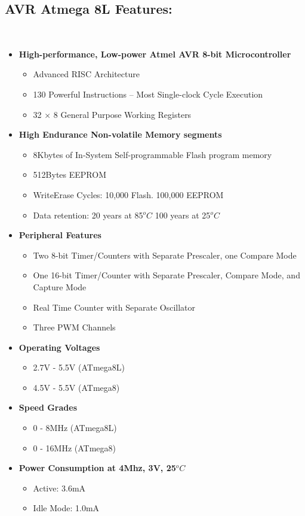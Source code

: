\documentclass[12pt, a4paper]{article}
\begin{document}
{\begin{appendices}
\section{AVR Atmega 8L Features:}
~\\
\begin{itemize}
\item \textbf{High-performance, Low-power Atmel AVR 8-bit Microcontroller}
\begin{itemize}
\item Advanced \ac{RISC} Architecture
\item 130 Powerful Instructions – Most Single-clock Cycle Execution
\item 32 × 8 General Purpose Working Registers
\end{itemize}
\item \textbf{High Endurance Non-volatile Memory segments}
\begin{itemize}
\item 8Kbytes of In-System Self-programmable Flash program memory
\item 512Bytes EEPROM
\item WriteErase Cycles: 10,000 Flash. 100,000 \ac{EEPROM}
\item Data retention: 20 years at 85$^oC$ 100 years at 25$^oC$
\end{itemize}
\item \textbf{Peripheral Features}
\begin{itemize}
\item Two 8-bit Timer/Counters with Separate Prescaler, one Compare Mode
\item One 16-bit Timer/Counter with Separate Prescaler, Compare Mode, and Capture Mode
\item Real Time Counter with Separate Oscillator
\item Three PWM Channels
\end{itemize}
\item \textbf{Operating Voltages}
\begin{itemize}
\item 2.7V - 5.5V (ATmega8L)
\item 4.5V - 5.5V (ATmega8)
\end{itemize}
\item \textbf{Speed Grades}
\begin{itemize}
\item 0 - 8MHz (ATmega8L)
\item 0 - 16MHz (ATmega8)
\end{itemize}
\item \textbf{Power Consumption at 4Mhz, 3V, 25$^oC$}
\begin{itemize}
\item Active: 3.6mA
\item Idle Mode: 1.0mA
\end{itemize}
\end{itemize}
\newpage


\end{appendices}}
\end{document}
